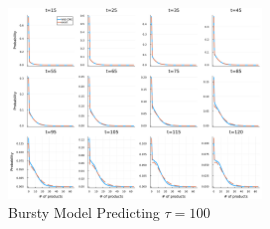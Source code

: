 \documentclass[a4paper,10pt]{article}
\begin{document}
\begin{figure}[h]
	\centering
	\includegraphics[width=0.6\textwidth]{Figs/Bursty_predicting_tau=100.pdf}
	\caption{Bursty Model Predicting $\tau=100$}\label{Bursty_predicting_tau=100}  
\end{figure}
\end{document}
